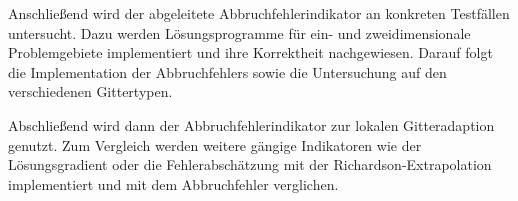 Anschließend wird der abgeleitete Abbruchfehlerindikator an konkreten Testfällen untersucht.
Dazu werden Lösungsprogramme für ein- und zweidimensionale Problemgebiete implementiert
und ihre Korrektheit nachgewiesen. Darauf folgt die Implementation
der Abbruchfehlers sowie die Untersuchung auf den verschiedenen Gittertypen.

Abschließend wird dann der Abbruchfehlerindikator zur lokalen Gitteradaption genutzt.
Zum Vergleich werden weitere gängige Indikatoren wie der Lösungsgradient oder
die Fehlerabschätzung mit der Richardson-Extrapolation implementiert und mit dem Abbruchfehler verglichen.

\cleardoublepage
